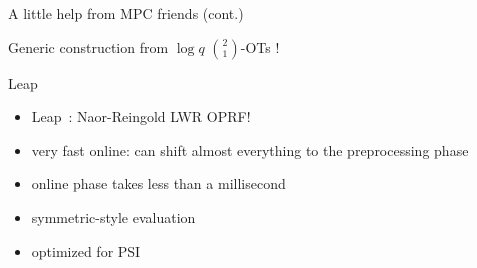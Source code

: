 \documentclass[10pt]{beamer}
\begin{document}
 \begin{frame}{A little help from MPC friends (cont.)}
   \centering
   \pause

   \vspace{1em}
   Generic construction from \alert{${\log q}$ $2\choose 1$-OTs} !
 \end{frame}
 \begin{frame}{Leap}
   \begin{itemize}
     \item Leap~\cite{EC:HKLMRR25}: Naor-Reingold LWR OPRF! \pause
     \item very fast online: can shift almost everything to the preprocessing phase\pause
     \item online phase takes less than a millisecond\pause
     \item \alert{symmetric-style} evaluation\pause
     \item optimized for PSI
   \end{itemize}
 \end{frame}
\end{document}
